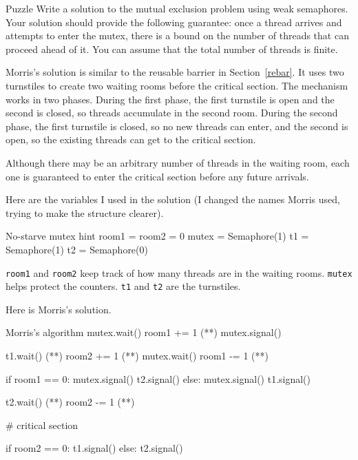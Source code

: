 \begin{puzzlebox}{Puzzle}
Write a solution to the mutual exclusion problem using weak
semaphores.  Your solution should provide the following guarantee:
once a thread arrives and attempts to enter the mutex, there is a
bound on the number of threads that can proceed ahead of it.  You can
assume that the total number of threads is finite.


\label{morris}

Morris's solution is similar to the reusable barrier in
Section~\ref{rebar}.  It uses two turnstiles to create two waiting
rooms before the critical section.  The mechanism works in two phases.
During the first phase, the first turnstile is open and the second is
closed, so threads accumulate in the second room.  During the second
phase, the first turnstile is closed, so no new threads can enter, and
the second is open, so the existing threads can get to the critical
section.

Although there may be an arbitrary number of threads in the waiting
room, each one is guaranteed to enter the critical section before any
future arrivals.

Here are the variables I used in the solution (I changed the
names Morris used, trying to make the structure clearer).

\begin{lstbox}{No-starve mutex hint}
room1 = room2 = 0
mutex = Semaphore(1)
t1 = Semaphore(1)
t2 = Semaphore(0)
\end{lstbox}

{\tt room1} and {\tt room2} keep track of how many threads are in the
waiting rooms.  {\tt mutex} helps protect the counters.  {\tt t1} and
{\tt t2} are the turnstiles.
\end{puzzlebox}



Here is Morris's solution.

\begin{lstbox}{Morris's algorithm}
mutex.wait()
    room1 += 1            (*\label{room1begin}*)
mutex.signal()
                           
t1.wait()                 (*\label{wait1}*)
    room2 += 1            (*\label{room2begin}*)
    mutex.wait()
    room1 -= 1            (*\label{room1end}*)

    if room1 == 0: 
        mutex.signal()
	t2.signal()
    else: 
        mutex.signal()
	t1.signal()

t2.wait()                  (*\label{wait2}*)
    room2 -= 1             (*\label{room2end}*)

    # critical section

    if room2 == 0:
        t1.signal()
    else:
        t2.signal()
\end{lstbox}

